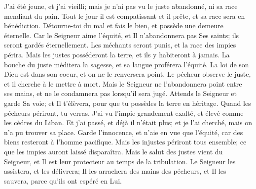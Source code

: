 {\VERSE J'ai été jeune, et j'ai vieilli; mais je n'ai pas vu le juste abandonné, ni sa race mendiant du pain. \EVERSE
\VERSE Tout le jour il est compatissant et il prête, et sa race sera en bénédiction. \EVERSE
\VERSE Détourne-toi du mal et fais le bien, et possède une demeure éternelle. \EVERSE
\VERSE Car le Seigneur aime l'équité, et Il n'abandonnera pas Ses saints; ils seront gardés éternellement. Les méchants seront punis, et la race des impies périra. \EVERSE
\VERSE Mais les justes posséderont la terre, et ils y habiteront à jamais. \EVERSE
\VERSE La bouche du juste méditera la sagesse, et sa langue proférera l'équité. \EVERSE
\VERSE La loi de son Dieu est dans son coeur, et on ne le renversera point. \EVERSE
\VERSE Le pécheur observe le juste, et il cherche à le mettre à mort. \EVERSE
\VERSE Mais le Seigneur ne l'abandonnera point entre ses mains, et ne le condamnera pas lorsqu'il sera jugé. \EVERSE
\VERSE Attends le Seigneur et garde Sa voie; et Il t'élèvera, pour que tu possèdes la terre en héritage. Quand les pécheurs périront, tu verras. \EVERSE
\VERSE J'ai vu l'impie grandement exalté, et élevé comme les cèdres du Liban. \EVERSE
\VERSE Et j'ai passé, et déjà il n'était plus; et je l'ai cherché, mais on n'a pu trouver sa place. \EVERSE
\VERSE Garde l'innocence, et n'aie en vue que l'équité, car des biens resteront à l'homme pacifique. \EVERSE
\VERSE Mais les injustes périront tous ensemble; ce que les impies auront laissé disparaîtra. \EVERSE
\VERSE Mais le salut des justes vient du Seigneur, et Il est leur protecteur au temps de la tribulation. \EVERSE
\VERSE Le Seigneur les assistera, et les délivrera; Il les arrachera des mains des pécheurs, et Il les sauvera, parce qu'ils ont espéré en Lui.

}
